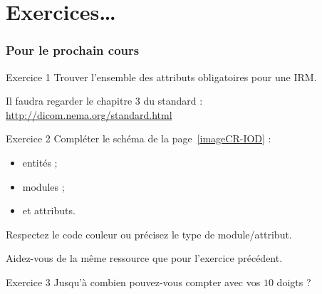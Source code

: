 \section{Exercices\ldots}

	\frame
	{
		\frametitle{Pour le prochain cours}
		
			\begin{block}{Exercice 1}
				Trouver l'ensemble des attributs obligatoires pour une IRM.

				Il faudra regarder le chapitre 3 du standard : \url{http://dicom.nema.org/standard.html}
			\end{block}

			\begin{block}{Exercice 2}
				Compl\'eter le sch\'ema de la page~\ref{imageCR-IOD} :
				\begin{itemize}
					\item entit\'es ;
					\item modules ;
					\item et attributs.
				\end{itemize}
				Respectez le code couleur ou pr\'ecisez le type de module/attribut.

				Aidez-vous de la m\^eme ressource que pour l'exercice pr\'ec\'edent.
			\end{block}

			\begin{block}{Exercice 3}
				Jusqu'\`a combien pouvez-vous compter avec vos $10$ doigts ?
			\end{block}
	}
